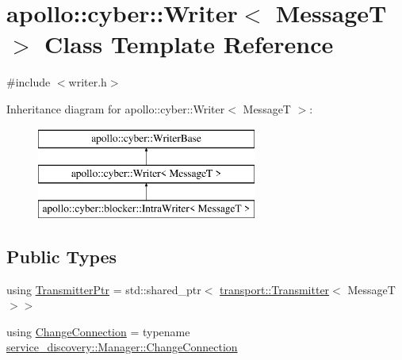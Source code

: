 \hypertarget{classapollo_1_1cyber_1_1Writer}{\section{apollo\-:\-:cyber\-:\-:Writer$<$ Message\-T $>$ Class Template Reference}
\label{classapollo_1_1cyber_1_1Writer}
}


{\ttfamily \#include $<$writer.\-h$>$}

Inheritance diagram for apollo\-:\-:cyber\-:\-:Writer$<$ Message\-T $>$\-:\begin{figure}[H]
\begin{center}
\leavevmode
\includegraphics[height=3.000000cm]{classapollo_1_1cyber_1_1Writer}
\end{center}
\end{figure}
\subsection*{Public Types}
\begin{DoxyCompactItemize}
\item 
using \hyperlink{classapollo_1_1cyber_1_1Writer_ab3727d9c195176d7f609546547ac44c4}{Transmitter\-Ptr} = std\-::shared\-\_\-ptr$<$ \hyperlink{classapollo_1_1cyber_1_1transport_1_1Transmitter}{transport\-::\-Transmitter}$<$ Message\-T $>$$>$
\item 
using \hyperlink{classapollo_1_1cyber_1_1Writer_ae6361e75e6d02a260e53caa52d16d9e2}{Change\-Connection} = typename \hyperlink{classapollo_1_1cyber_1_1service__discovery_1_1Manager_ab43fa282f6aa1b3b1180a1e416b98b68}{service\-\_\-discovery\-::\-Manager\-::\-Change\-Connection}
\end{DoxyCompactItemize}
